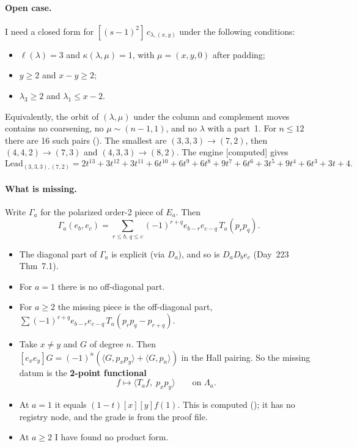 \documentclass[10pt]{article}
\newcommand{\file}[1]{{\footnotesize\texttt{\detokenize{#1}}}}
\newcommand{\grade}[1]{\textsf{[#1]}}
\newcommand{\Lead}{\mathrm{Lead}}
\begin{document}
\paragraph{Open case.} I need a closed form for $[(s-1)^2]\,c_{\lambda,(x,y)}$ under the following conditions:
\begin{itemize}
\item $\ell(\lambda)=3$ and $\kappa(\lambda,\mu)=1$, with $\mu=(x,y,0)$ after padding;
\item $y\ge2$ and $x-y\ge2$;
\item $\lambda_3\ge2$ and $\lambda_1\le x-2$.
\end{itemize}
Equivalently, the orbit of $(\lambda,\mu)$ under the column and complement moves contains no coarsening, no
$\mu\sim(n-1,1)$, and no $\lambda$ with a part~1. For $n\le12$ there are 16 such pairs (\file{classify.py}).
The smallest are $(3,3,3)\to(7,2)$, then $(4,4,2)\to(7,3)$ and $(4,3,3)\to(8,2)$. The engine \grade{computed} gives
\[\Lead_{(3,3,3),(7,2)}=2t^{13}+3t^{12}+3t^{11}+6t^{10}+6t^9+6t^8+9t^7+6t^6+3t^5+9t^4+6t^3+3t+4.\]

\paragraph{What is missing.} Write $\Gamma_a$ for the polarized order-2 piece of $E_a$. Then
\[\Gamma_a(e_b,e_c)=\sum_{r\le b,\,q\le c}(-1)^{r+q}e_{b-r}e_{c-q}\,T_a(p_rp_q).\]
\begin{itemize}
\item The diagonal part of $\Gamma_a$ is explicit (via $D_a$), and so is $D_aD_be_c$ (Day~223 Thm~7.1).
\item For $a=1$ there is no off-diagonal part.
\item For $a\ge2$ the missing piece is the off-diagonal part,
  $\sum(-1)^{r+q}e_{b-r}e_{c-q}\,T_a(p_rp_q-p_{r+q})$.
\item Take $x\ne y$ and $G$ of degree $n$. Then $[e_xe_y]G=(-1)^n(\langle G,p_xp_y\rangle+\langle G,p_n\rangle)$ in the
  Hall pairing. So the missing datum is the \textbf{2-point functional}
  \[f\longmapsto\langle T_af,\;p_xp_y\rangle\qquad\text{on }\Lambda_a.\]
\item At $a=1$ it equals $(1-t)[x][y]f(1)$. This is computed (\file{twopoint.log}); it has no registry node, and the
  grade is from the proof file.
\item At $a\ge2$ I have found no product form.
\end{itemize}
\end{document}

